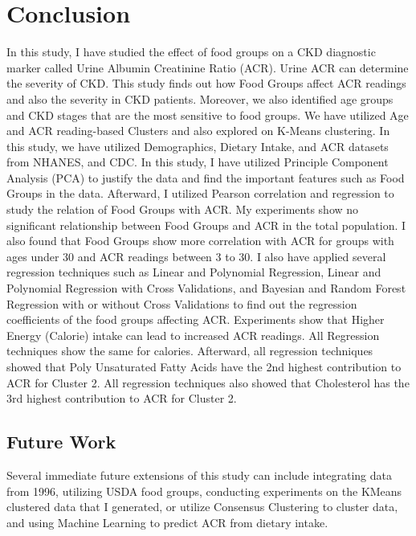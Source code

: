 \section{Conclusion}

\flushleft \justifying %
\flushleft \justifying In this study, I have studied the effect of food groups on a CKD diagnostic marker called Urine Albumin Creatinine Ratio (ACR). Urine ACR can determine the severity of CKD. This study finds out how Food Groups affect ACR readings and also the severity in CKD patients. Moreover, we also identified age groups and CKD stages that are the most sensitive to food groups. We have utilized Age and ACR reading-based Clusters and also explored on K-Means clustering. In this study, we have utilized Demographics, Dietary Intake, and ACR datasets from NHANES, and CDC. In this study, I have utilized Principle Component Analysis (PCA) to justify the data and find the important features such as Food Groups in the data. Afterward, I utilized Pearson correlation and regression to study the relation of Food Groups with ACR. My experiments show no significant relationship between Food Groups and ACR in the total population. I also found that Food Groups show more correlation with ACR for groups with ages under 30 and ACR readings between 3 to 30. I also have applied several regression techniques such as Linear and Polynomial Regression, Linear and Polynomial Regression with Cross Validations, and Bayesian and Random Forest Regression with or without Cross Validations to find out the regression coefficients of the food groups affecting ACR. Experiments show that Higher Energy (Calorie) intake can lead to increased ACR readings. All Regression techniques show the same for calories. Afterward, all regression techniques showed that Poly Unsaturated Fatty Acids have the 2nd highest contribution to ACR for Cluster 2. All regression techniques also showed that Cholesterol has the 3rd highest contribution to ACR for Cluster 2.

\subsection{Future Work}
\flushleft \justifying Several immediate future extensions of this study can include integrating data from 1996, utilizing USDA food groups, conducting experiments on the KMeans clustered data that I generated, or utilize Consensus Clustering to cluster data, and using Machine Learning to predict ACR from dietary intake.

